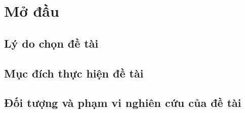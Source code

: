 \chapter*{\centering\Large{Mở đầu}}

\section*{Lý do chọn đề tài}

\blindtext

\section*{Mục đích thực hiện đề tài}

\blindtext

\section*{Đối tượng và phạm vi nghiên cứu của đề tài}

\blindtext

